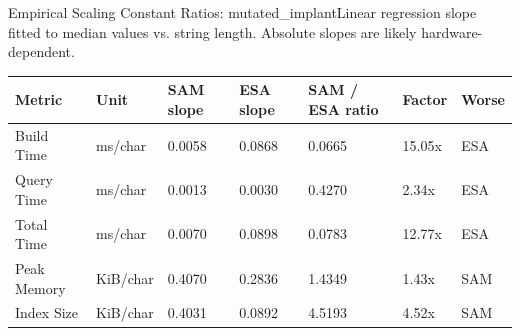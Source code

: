 \begin{benchmarktable}{Empirical Scaling Constant Ratios: mutated\_implant}{Linear regression slope fitted to median values vs. string length. Absolute slopes are likely hardware-dependent.}
\begin{tabularx}{\textwidth}{|X|X|X|X|X|X|X|}
\toprule
Metric & Unit & SAM slope & ESA slope & SAM / ESA ratio & Factor & Worse \\
\midrule
Build Time & ms/char & 0.0058 & 0.0868 & 0.0665 & 15.05x & ESA \\
Query Time & ms/char & 0.0013 & 0.0030 & 0.4270 & 2.34x & ESA \\
Total Time & ms/char & 0.0070 & 0.0898 & 0.0783 & 12.77x & ESA \\
Peak Memory & KiB/char & 0.4070 & 0.2836 & 1.4349 & 1.43x & SAM \\
Index Size & KiB/char & 0.4031 & 0.0892 & 4.5193 & 4.52x & SAM \\
\bottomrule
\end{tabularx}
\end{benchmarktable}